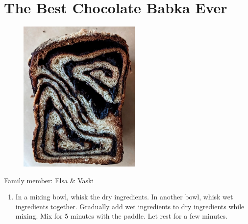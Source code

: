 \chapter{The Best Chocolate Babka Ever}
\label{ch:babka}


\begin{figure}
  \includegraphics[width=60mm]{velsa/images/Babka.png}
\end{figure}

Family member: Elsa \& Vaski

\begin{enumerate}
    \item In a mixing bowl, whisk the dry ingredients. In another bowl, whisk wet ingredients together. Gradually add wet ingredients to dry ingredients while mixing. Mix for 5 minutes with the paddle. Let rest for a few minutes.

\end{enumerate}

